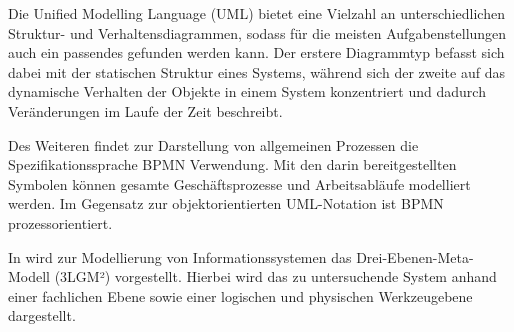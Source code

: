 Die Unified Modelling Language (UML) bietet eine Vielzahl an unterschiedlichen Struktur- und Verhaltensdiagrammen, sodass für die meisten Aufgabenstellungen auch ein passendes gefunden werden kann. Der erstere Diagrammtyp befasst sich dabei mit der statischen Struktur eines Systems, während sich der zweite auf das dynamische Verhalten der Objekte in einem System konzentriert und dadurch Veränderungen im Laufe der Zeit beschreibt. 

Des Weiteren findet zur Darstellung von allgemeinen Prozessen die Spezifikationssprache BPMN Verwendung. Mit den darin bereitgestellten Symbolen können gesamte Geschäftsprozesse und Arbeitsabläufe modelliert werden. Im Gegensatz zur objektorientierten UML-Notation ist BPMN prozessorientiert.

In \citet{Winter.2023} wird zur Modellierung von Informationssystemen das Drei-Ebenen-Meta-Modell (3LGM²) vorgestellt. Hierbei wird das zu untersuchende System anhand einer fachlichen Ebene sowie einer logischen und physischen Werkzeugebene dargestellt.
